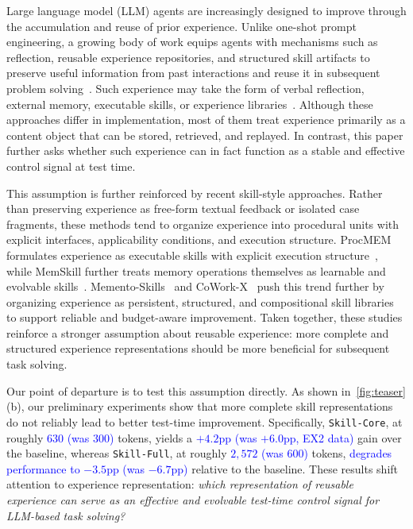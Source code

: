 \documentclass{article}
\newcommand{\blue}[1]{\textcolor{blue}{#1}}
\begin{document}
Large language model (LLM) agents are increasingly designed to improve through the accumulation and reuse of prior experience. 
Unlike one-shot prompt engineering, a growing body of work equips agents with mechanisms such as reflection, reusable experience repositories, and structured skill artifacts to preserve useful information from past interactions and reuse it in subsequent problem solving~\cite{auto-agent-survey,LLM-based-agent}.
Such experience may take the form of verbal reflection, external memory, executable skills, or experience libraries~\cite{Voyager,Reflexion,ExpeL}. 
Although these approaches differ in implementation, most of them treat experience primarily as a content object that can be stored, retrieved, and replayed. 
In contrast, this paper further asks whether such experience can in fact function as a stable and effective control signal at test time.

This assumption is further reinforced by recent skill-style approaches. 
Rather than preserving experience as free-form textual feedback or isolated case fragments, these methods tend to organize experience into procedural units with explicit interfaces, applicability conditions, and execution structure. 
ProcMEM formulates experience as executable skills with explicit execution structure~\cite{ProcMEM}, while MemSkill further treats memory operations themselves as learnable and evolvable skills~\cite{MemSkill}. 
Memento-Skills~\cite{Memento-Skills} and CoWork-X~\cite{CoWork-X} push this trend further by organizing experience as persistent, structured, and compositional skill libraries to support reliable and budget-aware improvement.
Taken together, these studies reinforce a stronger assumption about reusable experience: more complete and structured experience representations should be more beneficial for subsequent task solving.

Our point of departure is to test this assumption directly. 
As shown in~\cref{fig:teaser}(b), our preliminary experiments show that more complete skill representations do not reliably lead to better test-time improvement. 
Specifically, \texttt{Skill-Core}, at roughly \blue{$630$ (was $300$)} tokens, yields a \blue{$+4.2$pp (was $+6.0$pp, EX2 data)} gain over the baseline, whereas \texttt{Skill-Full}, at roughly \blue{$2{,}572$ (was $600$)} tokens, \blue{degrades performance to $-3.5$pp (was $-6.7$pp)} relative to the baseline. 
These results shift attention to experience representation: \emph{which representation of reusable experience can serve as an effective and evolvable test-time control signal for LLM-based task solving?}
\end{document}
